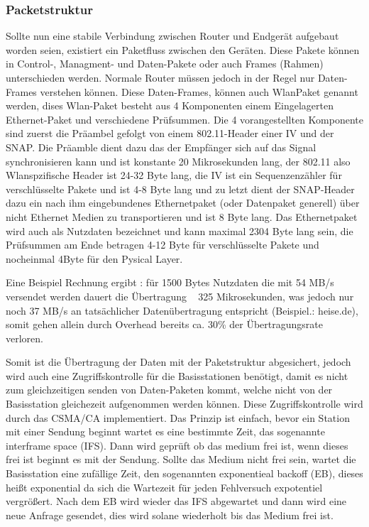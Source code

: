 \documentclass[a4paper,13pt]{scrartcl}
\begin{document}
\subsubsection*{Packetstruktur}
Sollte nun eine stabile Verbindung zwischen Router und Endgerät aufgebaut worden seien, existiert ein Paketfluss zwischen den Geräten. Diese Pakete können in Control-, Managment- und Daten-Pakete oder auch Frames (Rahmen) unterschieden werden. Normale Router müssen jedoch in der Regel nur Daten-Frames verstehen können. Diese Daten-Frames, können auch WlanPaket genannt werden, dises Wlan-Paket besteht aus 4 Komponenten einem Eingelagerten Ethernet-Paket und verschiedene Prüfsummen. Die 4 vorangestellten Komponente sind zuerst die Präambel gefolgt von einem 802.11-Header einer IV und der SNAP. Die Präamble dient dazu das der Empfänger sich auf das Signal synchronisieren kann und ist konstante 20 Mikrosekunden lang, der 802.11 also Wlanspzifische Header ist 24-32 Byte lang, die IV  ist ein Sequenzenzähler für verschlüsselte Pakete und ist 4-8 Byte lang und zu letzt dient der SNAP-Header dazu ein nach ihm eingebundenes Ethernetpaket (oder Datenpaket generell) über nicht Ethernet Medien zu transportieren und ist 8 Byte lang. Das Ethernetpaket wird auch als Nutzdaten bezeichnet und kann maximal 2304 Byte lang sein, die Prüfsummen am Ende betragen 4-12 Byte für verschlüsselte Pakete und nocheinmal 4Byte für den Pysical Layer.

Eine Beispiel Rechnung ergibt : für 1500 Bytes Nutzdaten die mit 54 MB/s versendet werden dauert die Übertragung ~ 325 Mikrosekunden, was jedoch nur noch 37 MB/s an tatsächlicher Datenübertragung entspricht (Beispiel.: heise.de), somit gehen allein durch Overhead bereits ca. 30\% der Übertragungsrate verloren. 

Somit ist die Übertragung der Daten mit der Paketstruktur abgesichert, jedoch wird auch eine Zugriffskontrolle für die Basisstationen benötigt, damit es nicht zum gleichzeitigen senden von Daten-Paketen kommt, welche nicht von der Basisstation gleichezeit aufgenommen werden können. Diese Zugriffskontrolle wird durch das CSMA/CA implementiert. Das Prinzip ist einfach, bevor ein Station mit einer Sendung beginnt wartet es eine bestimmte Zeit, das sogenannte interframe space (IFS). Dann wird geprüft ob das medium frei ist, wenn dieses frei ist beginnt es mit der Sendung. Sollte das Medium nicht frei sein, wartet die Basisstation eine zufällige Zeit, den sogenannten exponentieal backoff (EB), dieses heißt exponential da sich die Wartezeit für jeden Fehlversuch expotentiel vergrößert. Nach dem EB wird wieder das IFS abgewartet und dann wird eine neue Anfrage gesendet, dies wird solane wiederholt bis das Medium frei ist.
\end{document}
